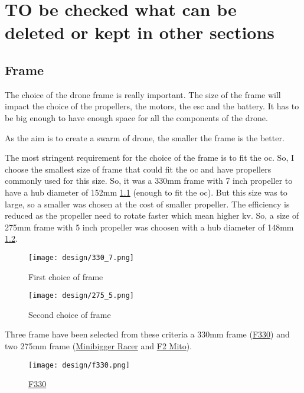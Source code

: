 \chapter{TO be checked what can be deleted or kept in other sections}
    \section{Frame}
        The choice of the drone frame is really important. The size of the frame will impact the choice of the propellers, the motors, the \acrshort{esc} and the battery. It has to be big enough to have enough space for all the components of the drone.
        
        As the aim is to create a swarm of drone, the smaller the frame is the better.
        
        The most stringent requirement for the choice of the frame is to fit the \gls{oc}. So, I choose the smallest size of frame that could fit the \gls{oc} and have propellers commonly used for this size. So, it was a 330mm frame with 7 inch propeller to have a hub diameter of 152mm \ref{fig:330_7} (enough to fit the \gls{oc}). But this size was to large, so a smaller was chosen at the cost of smaller propeller. The efficiency  is reduced as the propeller need to rotate faster which mean higher \gls{kv}. So, a size of 275mm frame with 5 inch propeller was choosen with a hub diameter of 148mm \ref{fig:275_5.png}.
        
        \begin{figure}[!ht]
            \centering
            \texttt{[image: design/330\_7.png]}
            \caption{First choice of frame}
            \label{fig:330_7}
        \end{figure}
        
        \begin{figure}[!ht]
            \centering
            \texttt{[image: design/275\_5.png]}
            \caption{Second choice of frame}
            \label{fig:275_5.png}
        \end{figure}
        
        Three frame have been selected from these criteria a 330mm frame (\hyperref[fig:f330]{F330}) and two 275mm frame (\hyperref[fig:minibiggerracer]{Minibigger Racer} and \hyperref[fig:f2mito]{F2 Mito}).
    
        \begin{figure}[!ht]
            \centering
            \texttt{[image: design/f330.png]}
            \caption{\href{https://www.banggood.com/DJI-F330-4-Axis-RC-Quadcopter-Frame-Kit-Support-KK-MK-MWC-p-943370.html?rmmds=search&ID=48074&cur_warehouse=CN}{F330}}
            \label{fig:f330}
        \end{figure}
    
